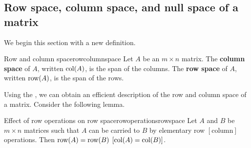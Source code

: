 \subsection{Row space, column space, and null space of a matrix}

We begin this section with a new definition.

\begin{definition}{Row and column space}{rowcolumnspace}
Let $A$ be an $m\times n$ matrix. The \textbf{column space} of $A$, written $\mbox{col}(A)$, is the
span of the columns. The \textbf{row space} of $A$, written $\mbox{row}(A)$, is the span of the rows.
\end{definition}

Using the {\rref}, we can obtain an efficient description of the row and column space of
a matrix. Consider the following lemma.

\begin{lemma}{Effect of row operations on row space}{rowoperationsrowspace}
Let $A$ and $B$ be $m\times n$ matrices such that $A$ can be carried to $B$ by elementary row $\left[ \mbox{column} \right]$ operations. Then $\mbox{row}(A)=\mbox{row}(B)$ $\left[\mbox{col}(A)=\mbox{col}(B) \right]$.
\end{lemma}

